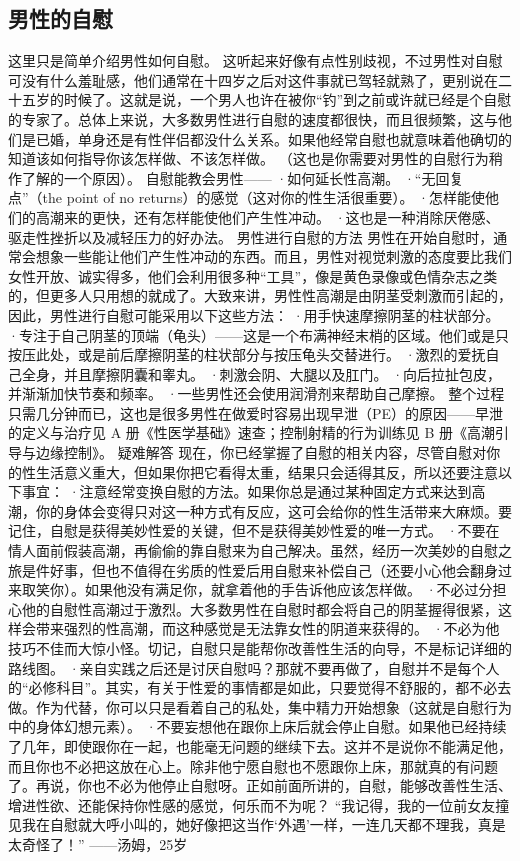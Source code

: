 \documentclass[12pt,UTF8,openany]{ctexbook}
\begin{document}
\subsection*{男性的自慰}
这里只是简单介绍男性如何自慰。
这听起来好像有点性别歧视，不过男性对自慰可没有什么羞耻感，他们通常在十四岁之后对这件事就已驾轻就熟了，更别说在二十五岁的时候了。这就是说，一个男人也许在被你“钓”到之前或许就已经是个自慰的专家了。总体上来说，大多数男性进行自慰的速度都很快，而且很频繁，这与他们是已婚，单身还是有性伴侣都没什么关系。如果他经常自慰也就意味着他确切的知道该如何指导你该怎样做、不该怎样做。
（这也是你需要对男性的自慰行为稍作了解的一个原因）。
自慰能教会男性——
·如何延长性高潮。
·“无回复点”（the point of no returns）的感觉（这对你的性生活很重要）。
·怎样能使他们的高潮来的更快，还有怎样能使他们产生性冲动。
·这也是一种消除厌倦感、驱走性挫折以及减轻压力的好办法。
男性进行自慰的方法
男性在开始自慰时，通常会想象一些能让他们产生性冲动的东西。而且，男性对视觉刺激的态度要比我们女性开放、诚实得多，他们会利用很多种“工具”，像是黄色录像或色情杂志之类的，但更多人只用想的就成了。大致来讲，男性性高潮是由阴茎受刺激而引起的，因此，男性进行自慰可能采用以下这些方法：
·用手快速摩擦阴茎的柱状部分。
·专注于自己阴茎的顶端（龟头）——这是一个布满神经末梢的区域。他们或是只按压此处，或是前后摩擦阴茎的柱状部分与按压龟头交替进行。
·激烈的爱抚自己全身，并且摩擦阴囊和睾丸。
·刺激会阴、大腿以及肛门。
·向后拉扯包皮，并渐渐加快节奏和频率。
·一些男性还会使用润滑剂来帮助自己摩擦。
整个过程只需几分钟而已，这也是很多男性在做爱时容易出现早泄（PE）的原因——早泄的定义与治疗见 A 册《性医学基础》速查；控制射精的行为训练见 B 册《高潮引导与边缘控制》。
疑难解答
现在，你已经掌握了自慰的相关内容，尽管自慰对你的性生活意义重大，但如果你把它看得太重，结果只会适得其反，所以还要注意以下事宜：
·注意经常变换自慰的方法。如果你总是通过某种固定方式来达到高潮，你的身体会变得只对这一种方式有反应，这可会给你的性生活带来大麻烦。要记住，自慰是获得美妙性爱的关键，但不是获得美妙性爱的唯一方式。
·不要在情人面前假装高潮，再偷偷的靠自慰来为自己解决。虽然，经历一次美妙的自慰之旅是件好事，但也不值得在劣质的性爱后用自慰来补偿自己（还要小心他会翻身过来取笑你）。如果他没有满足你，就拿着他的手告诉他应该怎样做。
·不必过分担心他的自慰性高潮过于激烈。大多数男性在自慰时都会将自己的阴茎握得很紧，这样会带来强烈的性高潮，而这种感觉是无法靠女性的阴道来获得的。
·不必为他技巧不佳而大惊小怪。切记，自慰只是能帮你改善性生活的向导，不是标记详细的路线图。
·亲自实践之后还是讨厌自慰吗？那就不要再做了，自慰并不是每个人的“必修科目”。其实，有关于性爱的事情都是如此，只要觉得不舒服的，都不必去做。作为代替，你可以只是看着自己的私处，集中精力开始想象（这就是自慰行为中的身体幻想元素）。
·不要妄想他在跟你上床后就会停止自慰。如果他已经持续了几年，即使跟你在一起，也能毫无问题的继续下去。这并不是说你不能满足他，而且你也不必把这放在心上。除非他宁愿自慰也不愿跟你上床，那就真的有问题了。再说，你也不必为他停止自慰呀。正如前面所讲的，自慰，能够改善性生活、增进性欲、还能保持你性感的感觉，何乐而不为呢？
“我记得，我的一位前女友撞见我在自慰就大呼小叫的，她好像把这当作‘外遇’一样，一连几天都不理我，真是太奇怪了！”
——汤姆，25岁
\end{document}
